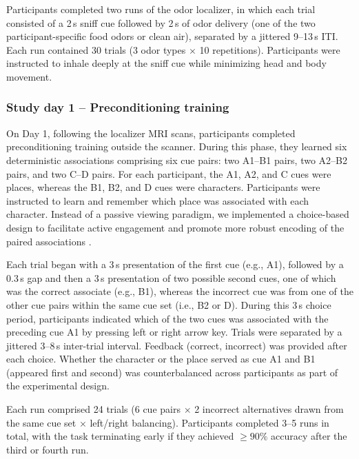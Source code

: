 \documentclass[12pt,letterpaper]{article}
\begin{document}
Participants completed two runs of the odor localizer, in which each trial consisted of a 2\,s sniff cue followed by 2\,s of odor delivery (one of the two participant-specific food odors or clean air), separated by a jittered 9--13\,s ITI. Each run contained 30 trials (3 odor types $\times$ 10 repetitions). Participants were instructed to inhale deeply at the sniff cue while minimizing head and body movement.






\subsubsection*{Study day 1 – Preconditioning training}

On Day 1, following the localizer MRI scans, participants completed preconditioning training outside the scanner. During this phase, they learned six deterministic associations comprising six cue pairs: two A1–B1 pairs, two A2–B2 pairs, and two C–D pairs. For each participant, the A1, A2, and C cues were places, whereas the B1, B2, and D cues were characters. Participants were instructed to learn and remember which place was associated with each character. Instead of a passive viewing paradigm, we implemented a choice-based design to facilitate active engagement and promote more robust encoding of the paired associations \cite{bunsey1996conservation}. 


Each trial began with a 3\,s presentation of the first cue (e.g., A1), followed by a 0.3\,s gap and then a 3\,s presentation of two possible second cues, one of which was the correct associate (e.g., B1), whereas the incorrect cue was from one of the other cue pairs within the same cue set (i.e., B2 or D). During this 3\,s choice period, participants indicated which of the two cues was associated with the preceding cue A1 by pressing left or right arrow key. Trials were separated by a jittered 3–8\,s inter-trial interval. Feedback (correct, incorrect) was provided after each choice. Whether the character or the place served as cue A1 and B1 (appeared first and second) was counterbalanced across participants as part of the experimental design.


Each run comprised 24 trials (6 cue pairs $\times$ 2 incorrect alternatives drawn from the same cue set $\times$ left/right balancing). Participants completed 3--5 runs in total, with the task terminating early if they achieved $\geq 90\%$ accuracy after the third or fourth run.
\end{document}
